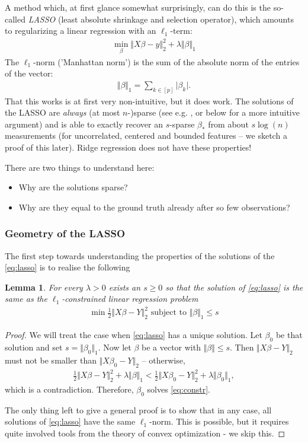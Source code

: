 \documentclass{article}
\newtheorem{lemma}{Lemma}
\newcommand{\abs}[1]{\vert #1 \vert}
\newcommand{\norm}[1]{\Vert #1 \Vert}
\begin{document}
A method which, at first glance somewhat surprisingly, can do this is the so-called \emph{LASSO} (least absolute shrinkage and selection operator), which amounts to regularizing a linear regression with an $\ell_1$-term:
\begin{align} \label{eq:lasso}
    \min_{\beta} \norm{X\beta-y}_2^2 + \lambda \norm{\beta}_1
\end{align}
The $\ell_1$-norm ('Manhattan norm') is the sum of the absolute norm of the entries of the vector:
\begin{align*}
    \norm{\beta}_1 = \sum_{k \in [p]} \abs{\beta_k}.
\end{align*}
That this works is at first very non-intuitive, but it does work. The solutions of the LASSO are \emph{always} (at most $n$-)sparse (see e.g. \cite[Th.6]{UnserStructure}, or below for a more intuitive argument) and is able to exactly recover an $s$-sparse $\beta_*$ from about $s\log(n)$ measurements (for uncorrelated, centered and bounded features -- we sketch a proof of this later). Ridge regression does not have these properties!

There are two things to understand here: 
\begin{itemize}
    \item Why are the solutions sparse?
    \item Why are they equal to the ground truth already after so few observations?
\end{itemize}

\subsubsection{Geometry of the LASSO} The first step towards understanding the properties of the solutions of the \eqref{eq:lasso} is to realise the following
\begin{lemma}
    For every $\lambda>0$ exists an $s\geq 0 $ so that the solution of \eqref{eq:lasso} is the same as the $\ell_1$-constrained linear regression problem
\begin{align}
    \min \tfrac{1}{2}\norm{X\beta-Y}_2^2 \text{ subject to } \norm{\beta}_1 \leq s \label{eq:constr}
\end{align}
\end{lemma} 
\begin{proof}
    We will treat the case when \eqref{eq:lasso} has a unique solution. Let $\beta_0$ be that solution and set $s = \norm{\beta_0}_1$. Now let $\beta$ be a vector with $\norm{\beta} \leq s$. Then $\norm{X\beta-Y}_2$ must not be smaller than $\norm{X\beta_0 -Y}_2$ -- otherwise,
    \begin{align*}
        \tfrac{1}{2}\norm{X\beta-Y}_2^2 + \lambda \norm{\beta}_1 < \tfrac{1}{2}\norm{X\beta_0-Y}_2^2 + \lambda \norm{\beta_0}_1, 
    \end{align*}
    which is a contradiction. Therefore, $\beta_0$ solves \eqref{eq:constr}. 

    The only thing left to give a general proof is to show that in any case, all solutions of \eqref{eq:lasso} have the same $\ell_1$-norm. This is possible, but it requires quite involved tools from the theory of convex optimization - we skip this.
\end{proof}
\end{document}
